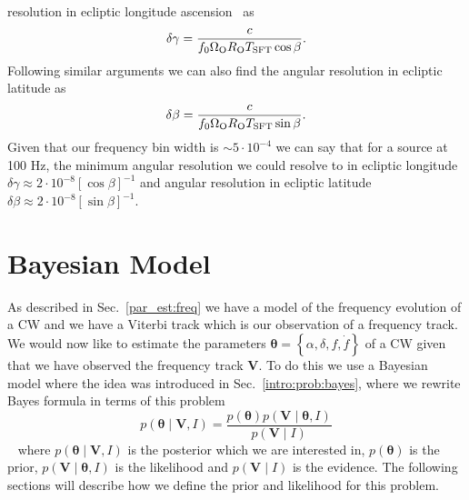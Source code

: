 resolution in ecliptic longitude ascension~ as
%
\begin{equation}
    \delta \gamma = \frac{c}{f_0 \Omega_{\rm{O}} R_{\rm{O}} T_{\rm{SFT}} \cos \beta}.
\end{equation}
%
 Following similar
arguments we can also find the angular resolution in ecliptic latitude as
%
\begin{equation}
    \delta \beta = \frac{c}{f_0 \Omega_{\rm{O}} R_{\rm{O}} T_{\rm{SFT}} \sin \beta}.
\end{equation}
%
 Given that our frequency bin width
is $\sim 5 \cdot 10^{-4}$ we can say that for a source at 100 Hz, the minimum
angular resolution we could resolve to in ecliptic longitude $\delta \gamma
\approx 2 \cdot 10^{-8} [\cos{\beta}]^{-1}$ and angular resolution in ecliptic
latitude $\delta \beta \approx 2 \cdot 10^{-8} [\sin{\beta}]^{-1}$.~

%
%
\section{\label{par_est:bayes}Bayesian Model}
%
%

As described in Sec.~\ref{par_est:freq} we have a model of the frequency
evolution of a \gls{CW} and we have a Viterbi track which is our observation of
a frequency track.  We would now like to estimate the parameters $\bm{\theta} =
\left\{\alpha, \delta, f, \dot{f} \right\}$ of a \gls{CW} given that we have
observed the frequency track $\bm{V}$.  To do this we use a Bayesian model
where the idea was introduced in Sec.~\ref{intro:prob:bayes}, where we rewrite
Bayes formula in terms of this problem~
%
\begin{equation}
    \label{par_est:bayes:eqn}
    p(\bm{\theta} \mid \bm{V}, I) = \frac{p(\bm{\theta}) p(\bm{V} \mid \bm{\theta}, I)}{p(\bm{V} \mid I)}
\end{equation}
%
~ where
$p(\bm{\theta} \mid \bm{V}, I)$ is the posterior which we are interested in,
$p(\bm{\theta})$ is the prior, $p(\bm{V} \mid \bm{\theta}, I)$ is the
likelihood and $p(\bm{V} \mid I)$ is the  evidence. The
following sections will describe how we define the prior and likelihood for
this problem.

